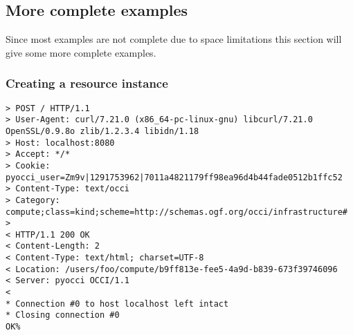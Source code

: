 \documentclass[10pt,a4paper]{article}
\begin{document}

\subsection{More complete examples}
Since most examples are not complete due to space limitations this
section will give some more complete examples.

\subsubsection{Creating a resource instance}
\begin{verbatim}
> POST / HTTP/1.1
> User-Agent: curl/7.21.0 (x86_64-pc-linux-gnu) libcurl/7.21.0 OpenSSL/0.9.8o zlib/1.2.3.4 libidn/1.18
> Host: localhost:8080
> Accept: */*
> Cookie: pyocci_user=Zm9v|1291753962|7011a4821179ff98ea96d4b44fade0512b1ffc52
> Content-Type: text/occi
> Category: compute;class=kind;scheme=http://schemas.ogf.org/occi/infrastructure#
> 
< HTTP/1.1 200 OK
< Content-Length: 2
< Content-Type: text/html; charset=UTF-8
< Location: /users/foo/compute/b9ff813e-fee5-4a9d-b839-673f39746096
< Server: pyocci OCCI/1.1
< 
* Connection #0 to host localhost left intact
* Closing connection #0
OK% 
\end{verbatim}
\end{document}
